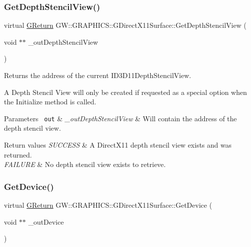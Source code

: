 \subsubsection{\texorpdfstring{GetDepthStencilView()}{GetDepthStencilView()}}
{\footnotesize\ttfamily virtual \mbox{\hyperlink{namespaceGW_a67a839e3df7ea8a5c5686613a7a3de21}{G\+Return}} G\+W\+::\+G\+R\+A\+P\+H\+I\+C\+S\+::\+G\+Direct\+X11\+Surface\+::\+Get\+Depth\+Stencil\+View (\begin{DoxyParamCaption}\item[{void $\ast$$\ast$}]{\+\_\+out\+Depth\+Stencil\+View }\end{DoxyParamCaption})\hspace{0.3cm}{\ttfamily [pure virtual]}}



Returns the address of the current I\+D3\+D11\+Depth\+Stencil\+View. 

A Depth Stencil View will only be created if requested as a special option when the \textquotesingle{}Initialize\textquotesingle{} method is called.


\begin{DoxyParams}[1]{Parameters}
\mbox{\texttt{ out}}  & {\em \+\_\+out\+Depth\+Stencil\+View} & Will contain the address of the depth stencil view.\\
\hline
\end{DoxyParams}

\begin{DoxyRetVals}{Return values}
{\em S\+U\+C\+C\+E\+SS} & A Direct\+X11 depth stencil view exists and was returned. \\
\hline
{\em F\+A\+I\+L\+U\+RE} & No depth stencil view exists to retrieve. \\
\hline
\end{DoxyRetVals}
\mbox{\label{classGW_1_1GRAPHICS_1_1GDirectX11Surface_a076c4f3a07f79f578185416be449ebd2}} 
\subsubsection{\texorpdfstring{GetDevice()}{GetDevice()}}
{\footnotesize\ttfamily virtual \mbox{\hyperlink{namespaceGW_a67a839e3df7ea8a5c5686613a7a3de21}{G\+Return}} G\+W\+::\+G\+R\+A\+P\+H\+I\+C\+S\+::\+G\+Direct\+X11\+Surface\+::\+Get\+Device (\begin{DoxyParamCaption}\item[{void $\ast$$\ast$}]{\+\_\+out\+Device }\end{DoxyParamCaption})\hspace{0.3cm}{\ttfamily [pure virtual]}}



